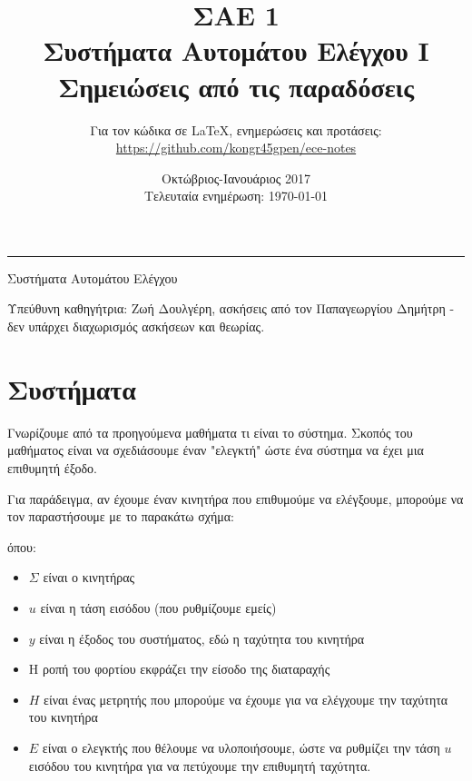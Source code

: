 \documentclass[11pt,a4paper,notitlepage,fleqn,draft]{article}
\title{ΣΑΕ 1
	\\
	{ 
		\normalsize Συστήματα Αυτομάτου Ελέγχου I
		\\
		\normalsize Σημειώσεις από τις παραδόσεις
	}}
\date{Οκτώβριος-Ιανουάριος 2017
	\\
	{ 
		\small Τελευταία ενημέρωση: \today
	}
}
\author{
	Για τον κώδικα σε \LaTeX, ενημερώσεις και προτάσεις:
	\\
	\url{https://github.com/kongr45gpen/ece-notes}}
\begin{document}
\maketitle

\hrule
\vspace{50pt}
	
Συστήματα Αυτομάτου Ελέγχου
	
Υπεύθυνη καθηγήτρια: Ζωή Δουλγέρη, ασκήσεις από τον Παπαγεωργίου Δημήτρη - δεν υπάρχει διαχωρισμός ασκήσεων και θεωρίας.

\section{Συστήματα}
Γνωρίζουμε από τα προηγούμενα μαθήματα τι είναι το σύστημα. Σκοπός του μαθήματος είναι να σχεδιάσουμε έναν "ελεγκτή" ώστε ένα σύστημα να έχει μια επιθυμητή έξοδο.

Για παράδειγμα, αν έχουμε έναν κινητήρα που επιθυμούμε να ελέγξουμε, μπορούμε να τον παραστήσουμε με το παρακάτω σχήμα:


όπου:
\begin{itemize}
	\item \( \Sigma \) είναι ο κινητήρας
	\item \( u \) είναι η τάση εισόδου (που ρυθμίζουμε εμείς)
	\item \( y \) είναι η έξοδος του συστήματος, εδώ η ταχύτητα του κινητήρα
	\item Η ροπή του φορτίου εκφράζει την είσοδο της διαταραχής
	\item \( H \) είναι ένας μετρητής που μπορούμε να έχουμε για να ελέγχουμε την ταχύτητα
	του κινητήρα
	\item \( E \) είναι ο ελεγκτής που θέλουμε να υλοποιήσουμε, ώστε να ρυθμίζει την
	τάση \( u \) εισόδου του κινητήρα για να πετύχουμε την επιθυμητή ταχύτητα.
\end{itemize}
\end{document}
